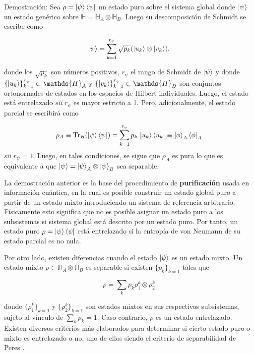 \documentclass{report} %
\numberwithin{equation}{section}
\begin{document}
\begin{tcolorbox}
Demostración: Sea $\rho = \ket{\psi} \bra{{\psi}}$ un estado puro sobre el sistema global donde  $\ket{\psi}$ un estado genérico sobre $\mathds{H} = \mathds{H}_A \otimes \mathds{H}_B$. Luego su descomposición de Schmidt se escribe como 

$$
\ket{\psi} =\sum _{k=1}^{r_{\psi }}{\sqrt {p_{k}}}(\ket{u_k} \otimes \ket{v_k} ),
$$

donde los $\sqrt {p_{k}}$ son números positivos, $r_{\psi }$ el rango de Schmidt de $\ket{\psi}$ y donde $ \{\ket{u_k} \}_{k=1}^{r_{\psi }}\subset \mathds{H}_{A}$ y $\{\ket{v_k} \}_{k=1}^{r_{\psi }}\subset \mathds{H}_{B}$ son conjuntos ortonormales de estados en los espacios de Hilbert individuales. Luego, el estado está entrelazado \textit{sii} $r_{\psi}$ es mayor estricto a 1. Pero, adicionalmente, el estado parcial se escribirá como

$$
\rho _{A}\equiv \Tr_{B}(\ket{\psi} \bra{\psi})=\sum _{k=1}^{r_{\psi }}p_{k}\,\ket{u_k} \bra{u_{k}} \equiv \ket{\phi}_{A} \bra{\phi}_{A}
$$
\textit{sii} $r_{\psi}=1$. Luego, en tales condiciones,  se sigue que $\rho _{A}$ es pura lo que es equivalente a que $\ket{\psi} = \ket{\psi}_{A}\otimes\ket{\psi}_{B}$ sea separable.
\end{tcolorbox}

La demostración anterior es la base del procedimiento de \textbf{purificación} \cite{Nielsen.00} usada en información cuántica, en la cual es posible construir un estado global puro a partir de un estado mixto introduciendo un sistema de referencia arbitrario. Físicamente esto significa que no es posible asignar un estado puro a los subsistemas si sistema global está descrito por un estado puro. Por tanto, un estado puro $\rho = \ket{\psi}\bra{\psi}$ está entrelazado si la entropía de von Neumann de su estado parcial es no nula. \newline

Por otro lado, existen diferencias cuando el estado $\ket{\psi}$ es un estado mixto. Un estado mixto $\rho \in \mathds{H}_A \otimes \mathds{H}_B$ es separable si existen $\{p_k\}_{k=1}$ tales que

$$
\rho = \sum_{k} p_{k} \rho_{1}^{k} \otimes \rho_{2}^{k} 
$$ 

donde $\{\rho_1^{k}\}_{k=1}$ y $\{\rho_2^{k}\}_{k=1}$ son estados mixtos en sus respectivos subsistemas, sujeto al vínculo de $\sum_{k} p_k = 1$. Caso contrario, $\rho$ es un estado entrelazado. Existen diversos criterios más elaborados para determinar si cierto estado puro o mixto es entrelazado o no, uno de ellos siendo el criterio de separabilidad de Peres \cite{Nielsen.00}. \newline
\end{document}
